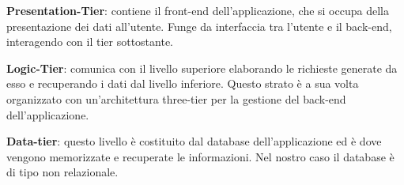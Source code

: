 \textbf{Presentation-Tier}: contiene il front-end dell'applicazione, che si occupa della presentazione dei dati all'utente. Funge da interfaccia tra l'utente e il back-end, interagendo con il tier sottostante.

\textbf{Logic-Tier}: comunica con il livello superiore elaborando le richieste generate da esso e recuperando i dati dal livello inferiore. Questo strato è a sua volta organizzato con un'architettura three-tier per la gestione del back-end dell'applicazione.

\textbf{Data-tier}: questo livello è costituito dal database dell'applicazione ed è dove vengono memorizzate e recuperate le informazioni. Nel nostro caso il database è di tipo non relazionale.